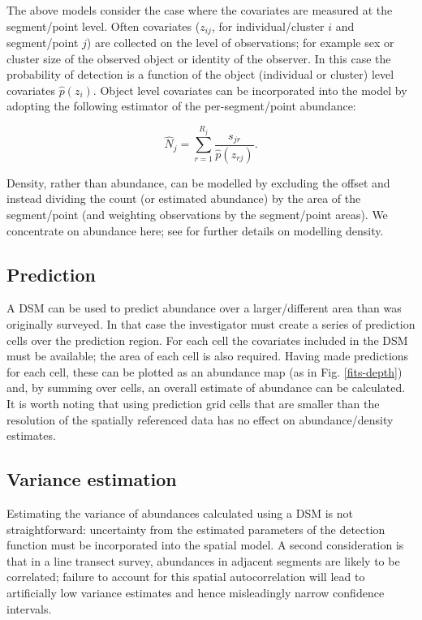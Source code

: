 \documentclass[a4paper,12pt]{article}
\begin{document}
The above models consider the case where the covariates are measured at the segment/point level. Often covariates ($z_{ij}$, for individual/cluster $i$ and segment/point $j$) are collected on the level of observations; for example sex or cluster size of the observed object or identity of the observer. In this case the probability of detection is a function of the object (individual or cluster) level covariates $\hat{p}(z_i)$. Object level covariates can be incorporated into the model by adopting the following estimator of the per-segment/point abundance:

\begin{equation*}
\hat{N}_j = \sum_{r=1}^{R_j} \frac{s_{jr}}{\hat{p}(z_{rj})}.
\end{equation*}

Density, rather than abundance, can be modelled by excluding the offset and instead dividing the count (or estimated abundance) by the area of the segment/point (and weighting observations by the segment/point areas). We concentrate on abundance here; see \cite{Hedley:2004et} for further details on modelling density.

\subsection*{Prediction}

A DSM can be used to predict abundance over a larger/different area than was originally surveyed. In that case the investigator must create a series of prediction cells over the prediction region. For each cell the covariates included in the DSM must be available; the area of each cell is also required. Having made predictions for each cell, these can be plotted as an abundance map (as in Fig. \ref{fits-depth}) and, by summing over cells, an overall estimate of abundance can be calculated. It is worth noting that using prediction grid cells that are smaller than the resolution of the spatially referenced data has no effect on abundance/density estimates.

\subsection*{Variance estimation}

Estimating the variance of abundances calculated using a DSM is not straightforward: uncertainty from the estimated parameters of the detection function must be incorporated into the spatial model. A second consideration is that in a line transect survey, abundances in adjacent segments are likely to be correlated; failure to account for this spatial autocorrelation will lead to artificially low variance estimates and hence misleadingly narrow confidence intervals.
\end{document}
